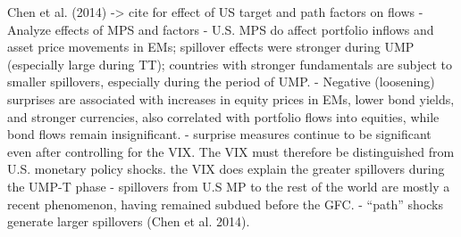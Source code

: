 Chen et al. (2014) -> cite for effect of US target and path factors on flows
- Analyze effects of MPS and factors
- U.S. MPS do affect portfolio inflows and asset price movements in EMs; spillover effects were stronger during UMP (especially large during TT); countries with stronger fundamentals are subject to smaller spillovers, especially during the period of UMP.
- Negative (loosening) surprises are associated with increases in equity prices in EMs, lower bond yields, and stronger currencies, also correlated with portfolio flows into equities, while bond flows remain insignificant.
- surprise measures continue to be significant even after controlling for the VIX. The VIX must therefore be distinguished from U.S. monetary policy shocks. the VIX does explain the greater spillovers during the UMP-T phase
- spillovers from U.S MP to the rest of the world are mostly a recent phenomenon, having remained subdued before the GFC.
- “path” shocks generate larger spillovers (Chen et al. 2014).


